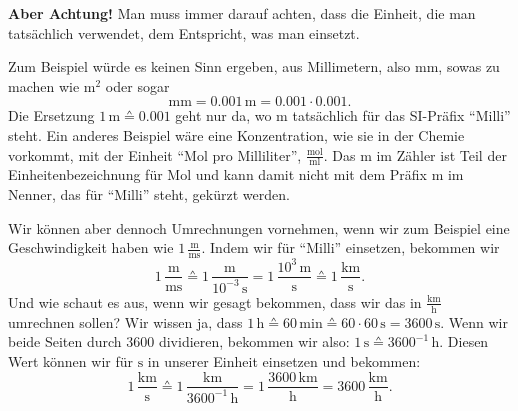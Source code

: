 \documentclass[../../main.tex]{subfiles}
\begin{document}
    \textbf{Aber Achtung!} Man muss immer darauf achten, dass die Einheit, die man tatsächlich verwendet, dem
    Entspricht, was man einsetzt.
    \begin{example}
        Zum Beispiel würde es keinen Sinn ergeben, aus Millimetern, also $\text{mm}$, sowas zu machen wie $\text{m}^2$
        oder sogar
        \[\text{mm} = 0.001\,\text{m} = 0.001\cdot 0.001.\]
        Die Ersetzung $1\,\text{m} \corresponds 0.001$ geht nur da, wo $\text{m}$ tatsächlich für das SI-Präfix
        \enquote{Milli} steht.
        Ein anderes Beispiel wäre eine Konzentration, wie sie in der Chemie vorkommt, mit der Einheit
        \enquote{Mol pro Milliliter}, $\frac{\text{mol}}{\text{ml}}$.
        Das $\text{m}$ im Zähler ist Teil der Einheitenbezeichnung für Mol und kann damit nicht mit dem Präfix
        $\text{m}$ im Nenner, das für \enquote{Milli} steht, gekürzt werden.

        Wir können aber dennoch Umrechnungen vornehmen, wenn wir zum Beispiel eine Geschwindigkeit haben wie
        $1\,\frac{\text{m}}{\text{ms}}$.
        Indem wir für \enquote{Milli} einsetzen, bekommen wir
        \[
            1\,\frac{\text{m}}{\text{ms}} \corresponds 1\,\frac{\text{m}}{10^{-3}\,\text{s}}
            = 1\,\frac{10^3\,\text{m}}{\text{s}} \corresponds 1\,\frac{\text{km}}{\text{s}}.
        \]
        Und wie schaut es aus, wenn wir gesagt bekommen, dass wir das in $\frac{\text{km}}{\text{h}}$ umrechnen sollen?
        Wir wissen ja, dass $1\,\text{h} \corresponds 60\,\text{min} \corresponds 60\cdot 60\,\text{s} = 3600\,\text{s}$.
        Wenn wir beide Seiten durch $3600$ dividieren, bekommen wir also: $1\,\text{s} \corresponds 3600^{-1}\,\text{h}$.
        Diesen Wert können wir für $\text{s}$ in unserer Einheit einsetzen und bekommen:
        \[
            1\,\frac{\text{km}}{\text{s}} \corresponds 1\,\frac{\text{km}}{3600^{-1}\,\text{h}}
            = 1\,\frac{3600\,\text{km}}{\text{h}} = 3600\,\frac{\text{km}}{\text{h}}.
        \]
    \end{example}
\end{document}
